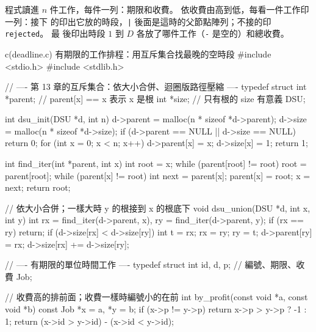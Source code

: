 程式讀進 $n$ 件工作，每件一列：期限和收費。 依收費由高到低，每看一件工作印一列：接下
的印出它放的時段，\texttt{|} 後面是這時的父節點陣列；不接的印 \texttt{rejected}。 最
後印出時段 $1$ 到 $D$ 各放了哪件工作（\texttt{-} 是空的）和總收費。

\begin{example}[label=ex:gr-deadline]{c}{(deadline.c) 有期限的工作排程：用互斥集合找最晚的空時段}
#include <stdio.h>
#include <stdlib.h>

// ---- 第 13 章的互斥集合：依大小合併、迴圈版路徑壓縮 ----
typedef struct {
    int *parent;    // parent[x] == x 表示 x 是根
    int *size;      // 只有根的 size 有意義
} DSU;

int dsu_init(DSU *d, int n)
{
    d->parent = malloc(n * sizeof *d->parent);
    d->size = malloc(n * sizeof *d->size);
    if (d->parent == NULL || d->size == NULL) {
        return 0;
    }
    for (int x = 0; x < n; x++) {
        d->parent[x] = x;
        d->size[x] = 1;
    }
    return 1;
}

int find_iter(int *parent, int x)
{
    int root = x;
    while (parent[root] != root) {
        root = parent[root];
    }
    while (parent[x] != root) {
        int next = parent[x];
        parent[x] = root;
        x = next;
    }
    return root;
}

// 依大小合併；一樣大時 y 的根接到 x 的根底下
void dsu_union(DSU *d, int x, int y)
{
    int rx = find_iter(d->parent, x), ry = find_iter(d->parent, y);
    if (rx == ry) {
        return;
    }
    if (d->size[rx] < d->size[ry]) {
        int t = rx;
        rx = ry;
        ry = t;
    }
    d->parent[ry] = rx;
    d->size[rx] += d->size[ry];
}

// ---- 有期限的單位時間工作 ----
typedef struct {
    int id, d, p;   // 編號、期限、收費
} Job;

// 收費高的排前面；收費一樣時編號小的在前
int by_profit(const void *a, const void *b)
{
    const Job *x = a, *y = b;
    if (x->p != y->p) {
        return x->p > y->p ? -1 : 1;
    }
    return (x->id > y->id) - (x->id < y->id);
}


\end{example}
